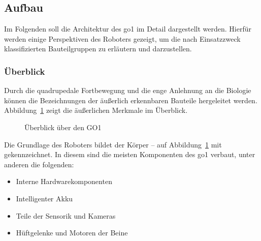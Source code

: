 \subsection{Aufbau}
\label{subsec:aufbau}

Im Folgenden soll die Architektur des \gls{go1} im Detail dargestellt werden.
Hierfür werden einige Perspektiven des Roboters gezeigt, um die nach Einsatzzweck klassifizierten Bauteilgruppen zu erläutern und darzustellen.

\subsubsection{Überblick}

Durch die quadrupedale Fortbewegung und die enge Anlehnung an die Biologie können die Bezeichnungen der äußerlich
erkennbaren Bauteile hergeleitet werden.
Abbildung~\ref{fig:allgemeine_architektur} zeigt die äußerlichen Merkmale im Überblick.

\begin{figure}[h]
    \caption{Überblick über den GO1}\label{fig:allgemeine_architektur}
\end{figure}

Die Grundlage des Roboters bildet der Körper -- auf Abbildung~\ref{fig:allgemeine_architektur} mit  gekennzeichnet.
In diesem sind die meisten Komponenten des \gls{go1} verbaut, unter anderen die folgenden:

\begin{itemize}
    \item Interne Hardwarekomponenten
    \item Intelligenter Akku
    \item Teile der Sensorik und Kameras
    \item Hüftgelenke und Motoren der Beine
\end{itemize}


